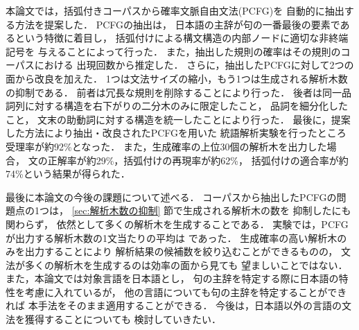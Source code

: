 本論文では，括弧付きコーパスから確率文脈自由文法(PCFG)を
自動的に抽出する方法を提案した．
PCFGの抽出は，
日本語の主辞が句の一番最後の要素であるという特徴に着目し，
括弧付けによる構文構造の内部ノードに適切な非終端記号を
与えることによって行った．
また，抽出した規則の確率はその規則のコーパスにおける
出現回数から推定した．
さらに，抽出したPCFGに対して2つの面から改良を加えた．
1つは文法サイズの縮小，もう1つは生成される解析木数の抑制である．
前者は冗長な規則を削除することにより行った．
後者は同一品詞列に対する構造を右下がりの二分木のみに限定したこと，
品詞を細分化したこと，
文末の助動詞に対する構造を統一したことにより行った．
最後に，提案した方法により抽出・改良されたPCFGを用いた
統語解析実験を行ったところ受理率が約92\%となった．
また，生成確率の上位30個の解析木を出力した場合，
文の正解率が約29\%，括弧付けの再現率が約62\%，
括弧付けの適合率が約74\%という結果が得られた．

最後に本論文の今後の課題について述べる．
コーパスから抽出したPCFGの問題点の1つは，
\ref{sec:解析木数の抑制} 節で生成される解析木の数を
抑制したにも関わらず，
依然として多くの解析木を生成することである．
実験では，PCFGが出力する解析木数の1文当たりの平均は
 であった．
生成確率の高い解析木のみを出力することにより
解析結果の候補数を絞り込むことができるものの，
文法が多くの解析木を生成するのは効率の面から見ても
望ましいことではない．
また，本論文では対象言語を日本語とし，
句の主辞を特定する際に日本語の特性を考慮に入れているが，
他の言語についても句の主辞を特定することができれば
本手法をそのまま適用することができる．
今後は，日本語以外の言語の文法を獲得することについても
検討していきたい．










